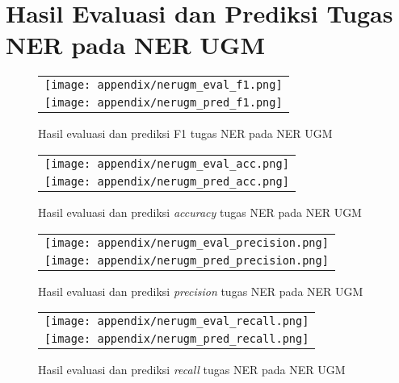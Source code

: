 \chapter{Hasil Evaluasi dan Prediksi Tugas NER pada NER UGM}
\label{appendix:nerugm}

\begin{figure}[h]
    \centering
    \begin{longtable}{c}
        \texttt{[image: appendix/nerugm\_eval\_f1.png]} \\
        \texttt{[image: appendix/nerugm\_pred\_f1.png]} \\
    \end{longtable}
    \caption{Hasil evaluasi dan prediksi F1 tugas NER pada NER UGM}
\end{figure}

\begin{figure}[h]
    \centering
    \begin{longtable}{c}
        \texttt{[image: appendix/nerugm\_eval\_acc.png]} \\
        \texttt{[image: appendix/nerugm\_pred\_acc.png]} \\
    \end{longtable}
    \caption{Hasil evaluasi dan prediksi \textit{accuracy} tugas NER pada NER UGM}
\end{figure}

\begin{figure}[h]
    \centering
    \begin{longtable}{c}
        \texttt{[image: appendix/nerugm\_eval\_precision.png]} \\
        \texttt{[image: appendix/nerugm\_pred\_precision.png]} \\
    \end{longtable}
    \caption{Hasil evaluasi dan prediksi \textit{precision} tugas NER pada NER UGM}
\end{figure}

\begin{figure}[h]
    \centering
    \begin{longtable}{c}
        \texttt{[image: appendix/nerugm\_eval\_recall.png]} \\
        \texttt{[image: appendix/nerugm\_pred\_recall.png]} \\
    \end{longtable}
    \caption{Hasil evaluasi dan prediksi \textit{recall} tugas NER pada NER UGM}
\end{figure}

